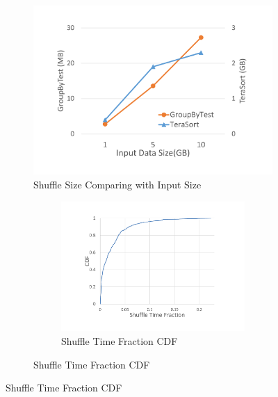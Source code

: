 \documentclass[10pt,twocolumn]{article}
\begin{document}
\begin{figure}
	\centering
	\begin{minipage}{0.34\linewidth}
		\begin{figure}[H]
			\includegraphics[width=\textwidth]{fig/shuffle_size}
			\caption{Shuffle Size Comparing with Input Size}
			\label{fig:shuffle_size}
		\end{figure}
	\end{minipage}
	\begin{minipage}{0.65\linewidth}
		\begin{figure}[H]
			\begin{subfigure}{0.5\textwidth}
				\includegraphics[width=\linewidth]{fig/reduce_cdf}
				\caption{Shuffle Time Fraction CDF}
				\label{fig:cdf}
			\end{subfigure}	

\end{figure}
\end{minipage}
\end{figure}
\end{document}
